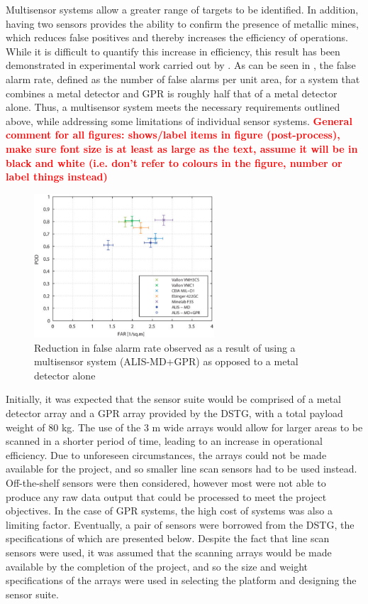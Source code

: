 \documentclass[main.tex]{subfiles}
\begin{document}
Multisensor systems allow a greater range of targets to be identified. In addition, having two sensors provides the ability to confirm the presence of metallic mines, which reduces false positives and thereby increases the efficiency of operations. While it is difficult to quantify this increase in efficiency, this result has been demonstrated in experimental work carried out by \textcite{Takahashi10}. As can be seen in , the false alarm rate, defined as the number of false alarms per unit area, for a system that combines a metal detector and GPR is roughly half that of a metal detector alone. Thus, a multisensor system meets the necessary requirements outlined above, while addressing some limitations of individual sensor systems. \textcolor{red}{\textbf{General comment for all figures: shows/label items in figure (post-process), make sure font size is at least as large as the text, assume it will be in black and white (i.e. don't refer to colours in the figure, number or label things instead)}}

\begin{figure}[ht]
\includegraphics[width=0.6\textwidth]{3-ConceptDesign/FAR.PNG}
\centering
\caption[Reduction in false alarm rate as a result of using a multisensor system]{Reduction in false alarm rate observed as a result of using a multisensor system (ALIS-MD+GPR) as opposed to a metal detector alone \parencite{Takahashi10}} 
\end{figure}

Initially, it was expected that the sensor suite would be comprised of a metal detector array and a GPR array provided by the DSTG, with a total payload weight of 80 kg. The use of the 3 m wide arrays would allow for larger areas to be scanned in a shorter period of time, leading to an increase in operational efficiency. Due to unforeseen circumstances, the arrays could not be made available for the project, and so smaller line scan sensors had to be used instead. Off-the-shelf sensors were then considered, however most were not able to produce any raw data output that could be processed to meet the project objectives. In the case of GPR systems, the high cost of systems was also a limiting factor. Eventually, a pair of sensors were borrowed from the DSTG, the specifications of which are presented below. Despite the fact that line scan sensors were used, it was assumed that the scanning arrays would be made available by the completion of the project, and so the size and weight specifications of the arrays were used in selecting the platform and designing the sensor suite. 
\end{document}
